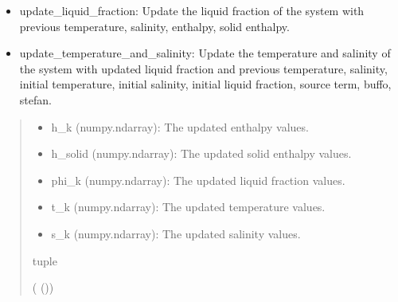 \documentclass[a4paper,11pt,english,openany]{sphinxmanual}
\begin{document}
\begin{fulllineitems}
\begin{description}
\begin{description}
\begin{itemize}
\item {} 
\sphinxAtStartPar
update\_liquid\_fraction: Update the liquid fraction of the system with previous temperature, salinity, enthalpy, solid enthalpy.

\item {} 
\sphinxAtStartPar
update\_temperature\_and\_salinity: Update the temperature and salinity of the system with updated liquid fraction and previous temperature, salinity, initial temperature, initial salinity, initial liquid fraction, source term, buffo, stefan.

\end{itemize}

\end{description}

\end{description}
\begin{quote}\begin{description}
\sphinxAtStartPar
\begin{description}
\begin{itemize}
\item {} 
\sphinxAtStartPar
h\_k (numpy.ndarray): The updated enthalpy values.

\item {} 
\sphinxAtStartPar
h\_solid (numpy.ndarray): The updated solid enthalpy values.

\item {} 
\sphinxAtStartPar
phi\_k (numpy.ndarray): The updated liquid fraction values.

\item {} 
\sphinxAtStartPar
t\_k (numpy.ndarray): The updated temperature values.

\item {} 
\sphinxAtStartPar
s\_k (numpy.ndarray): The updated salinity values.

\end{itemize}

\end{description}


\sphinxAtStartPar
tuple

\sphinxAtStartPar
{} ({\hyperref[\detokenize{api/spyice.preprocess.pre_process:src.spyice.preprocess.pre_process.PreprocessData}]{}} ())

\end{description}\end{quote}

\end{fulllineitems}
\end{document}
